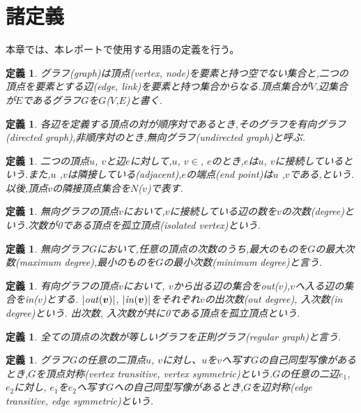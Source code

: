 \documentclass[11pt,a4j]{jsarticle}
\theoremstyle{plain}
\newtheorem{defi}[theo]{定義}
\def\vu{\mbox{\boldmath $u$}}
\def\vv{\mbox{\boldmath $v$}}
\begin{document}
\section{諸定義}
本章では、本レポートで使用する用語の定義を行う。

\begin{defi}
グラフ(graph)は頂点(vertex, node)を要素と持つ空でない集合と,二つの頂点を要素とする辺(edge, link)を要素と持つ集合からなる.頂点集合が$V$,辺集合が$E$であるグラフ$G$を$G$($V$,$E$)と書く.
\end{defi}

\begin{defi}
各辺を定義する頂点の対が順序対であるとき,そのグラフを有向グラフ(directed graph),非順序対のとき,無向グラフ(undirected graph)と呼ぶ.
\end{defi}

\begin{defi}
二つの頂点{\vu}, {\vv}と辺$e$に対して,{\vu}, {\vv}$\in$, $e$のとき,$e$は{\vu}, {\vv}に接続しているという.また,{\vu} ,{\vv}は隣接している(adjacent),$e$の端点(end point)は{\vu} ,{\vv}である,という.以後,頂点{\vv}の隣接頂点集合を$N$({\vv})で表す.
\end{defi}

\begin{defi}
無向グラフの頂点{\vv}において,{\vv}に接続している辺の数を{\vv}の次数(degree)という.次数が0である頂点を孤立頂点(isolated vertex)という.
\end{defi}

\begin{defi}
無向グラフ$G$において,任意の頂点の次数のうち,最大のものを$G$の最大次数(maximum degree),最小のものを$G$の最小次数(minimum degree)と言う.
\end{defi}

\begin{defi}
有向グラフの頂点{\vv}において, {\vv}から出る辺の集合を{\it out}({\vv}),{\vv}へ入る辺の集合を{\it in}({\vv})とする. $|{\it out}({\vv})|$, $|{\it in}({\vv})|$をそれぞれ{\vv}の出次数(out degree), 入次数(in degree)という. 出次数, 入次数が共に0である頂点を孤立頂点という.
\end{defi}

\begin{defi}
全ての頂点の次数が等しいグラフを正則グラフ(regular graph)と言う.
\end{defi}

\begin{defi}
グラフ$G$の任意の二頂点{\vu}, {\vv}に対し、{\vu}を{\vv}へ写す$G$の自己同型写像があるとき,$G$を頂点対称(vertex transitive, vertex symmetric)という.$G$の任意の二辺$e_1$, $e_2$に対し, $e_1$を$e_2$へ写す$G$への自己同型写像があるとき,$G$を辺対称(edge transitive, edge symmetric)という.
\end{defi}
\end{document}
